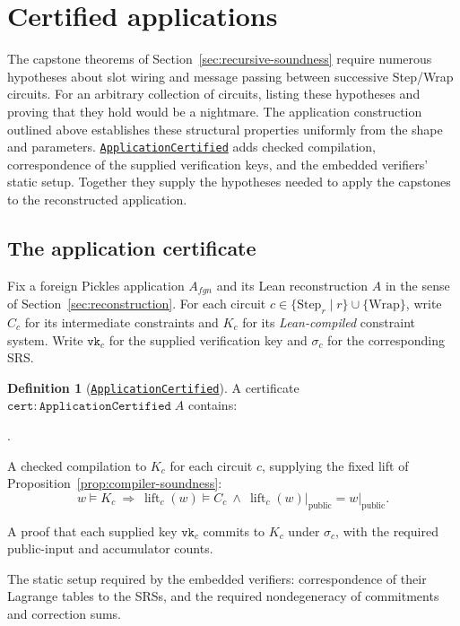 \documentclass[11pt,a4paper]{article}
\newcommand{\inlinecode}[1]{\mbox{\texttt{#1}}}
\newcommand{\restrict}[2]{\left.#1\right\rvert_{#2}}
\theoremstyle{definition}
\theoremstyle{insetstatement}
\newtheorem{definitiontext}[example]{Definition}
\newenvironment{statementblock}
  {\begin{list}{}{%
    \setlength{\leftmargin}{0pt}%
    \setlength{\rightmargin}{0pt}%
    \setlength{\labelwidth}{0pt}%
    \setlength{\labelsep}{0pt}%
    \setlength{\itemindent}{0pt}%
    \setlength{\listparindent}{0pt}%
    \setlength{\topsep}{.7\baselineskip plus 2pt minus 1pt}%
    \setlength{\partopsep}{0pt}%
    \setlength{\parsep}{0pt}%
    \setlength{\itemsep}{0pt}}%
    \item\relax}
  {\end{list}}
\newenvironment{definition}[1][]
  {\begin{statementblock}\begin{definitiontext}[{#1}]}
  {\end{definitiontext}\end{statementblock}}
\newcounter{boundarypart}
\newenvironment{boundary}{\begin{list}{\arabic{boundarypart}.}{
  \usecounter{boundarypart}
  \setlength{\leftmargin}{1.6em}
  \setlength{\labelwidth}{1.1em}
  \setlength{\labelsep}{0.5em}
  \setlength{\itemsep}{2pt}
  \setlength{\topsep}{3pt}
  \setlength{\parsep}{0pt}}}{\end{list}}
\begin{document}
\section{Certified applications}
\label{sec:certified-applications}

The capstone theorems of Section~\ref{sec:recursive-soundness} require
numerous hypotheses about slot wiring and message passing between
successive Step/Wrap circuits. For an arbitrary collection of circuits,
listing these hypotheses and proving that they hold would be a nightmare.
The application construction outlined above establishes these structural
properties uniformly from the shape and parameters. \href{https://github.com/l-adic/snarky/blob/main/formal/pickles/Pickles/Application/CheckedCompile.lean\#L201}{\inlinecode{ApplicationCertified}} adds checked
compilation, correspondence of the supplied verification keys, and the
embedded verifiers' static setup. Together they supply the hypotheses
needed to apply the capstones to the reconstructed application.

\subsection{The application certificate}
\label{sec:application-certificate}

Fix a foreign Pickles application $A_{fgn}$ and its Lean reconstruction $A$
in the sense of Section~\ref{sec:reconstruction}. For each circuit
\mbox{$c\in\{\mathrm{Step}_r\mid r\}\cup\{\mathrm{Wrap}\}$}, write $C_c$ for its
intermediate constraints and $K_c$ for its \emph{Lean-compiled} constraint
system. Write $\mathtt{vk}_c$ for the supplied verification key and
$\sigma_c$ for the corresponding SRS.

\begin{definition}[\href{https://github.com/l-adic/snarky/blob/main/formal/pickles/Pickles/Application/CheckedCompile.lean\#L201}{\inlinecode{ApplicationCertified}}]
\label{def:application-certified}
A certificate $\mathtt{cert}:\mathtt{ApplicationCertified}\;A$ contains:
\begin{boundary}
  \item A checked compilation to $K_c$ for each circuit $c$, supplying the
    fixed lift of Proposition~\ref{prop:compiler-soundness}:
    \[
      w\models K_c\ \Longrightarrow\
      \operatorname{lift}_c(w)\models C_c
      \ \land\ \restrict{\operatorname{lift}_c(w)}{\mathrm{public}}
        =\restrict{w}{\mathrm{public}}.
    \]
  \item A proof that each supplied key $\mathtt{vk}_c$ commits to $K_c$
    under $\sigma_c$, with the required public-input and accumulator counts.
  \item The static setup required by the embedded verifiers: correspondence
    of their Lagrange tables to the SRSs, and the required nondegeneracy of
    commitments and correction sums.
\end{boundary}
\end{definition}
\end{document}
